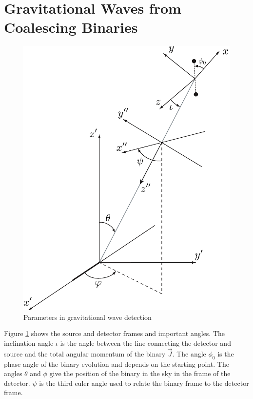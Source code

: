\documentclass{article}
\begin{document}
\section{Gravitational Waves from Coalescing Binaries}
\begin{figure}[h]
    \centering
    \includegraphics[scale=0.5]{euler.png}
    \caption{Parameters in gravitational wave detection}
    \label{fig:GWFrameParams}
\end{figure}

Figure \ref{fig:GWFrameParams} shows the
source and detector frames and important angles.  The inclination
angle $\iota$ is the angle between the line connecting the detector
and source and the total angular momentum of the binary $\vec{J}$. The angle $\phi_0$ is the phase angle of the binary evolution and depends on the starting point. The angles $\theta$ and $\phi$ give
the position of the binary in the sky in the frame of the detector.
$\psi$ is the third euler angle used to relate the binary frame to the detector frame. 
\end{document}
